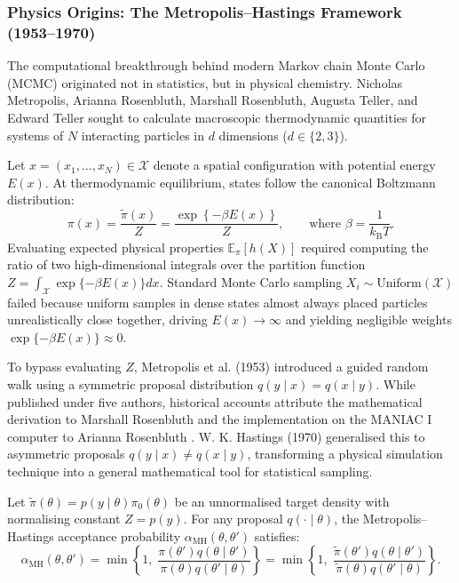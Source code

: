 \subsubsection{Physics Origins: The Metropolis--Hastings Framework (1953--1970)}
\label{subsec:metropolis-hastings}

The computational breakthrough behind modern Markov chain Monte Carlo (MCMC) originated not in statistics, but in physical chemistry. Nicholas Metropolis, Arianna Rosenbluth, Marshall Rosenbluth, Augusta Teller, and Edward Teller \cite{metropolis1953} sought to calculate macroscopic thermodynamic quantities for systems of $N$ interacting particles in $d$ dimensions ($d \in \{2, 3\}$).

Let $x = (x_1, \dots, x_N) \in \mathcal{X}$ denote a spatial configuration with potential energy $E(x)$. At thermodynamic equilibrium, states follow the canonical Boltzmann distribution:
\begin{equation}
    \pi(x) = \frac{\widetilde{\pi}(x)}{Z} = \frac{\exp\left\{-\beta E(x)\right\}}{Z}, \qquad \text{where } \beta = \frac{1}{k_{\mathrm{B}}T}.
\end{equation}
Evaluating expected physical properties $\mathbb{E}_{\pi}[h(X)]$ required computing the ratio of two high-dimensional integrals over the partition function $Z = \int_{\mathcal{X}} \exp\{-\beta E(x)\} dx$. Standard Monte Carlo sampling $X_i \sim \text{Uniform}(\mathcal{X})$ failed because uniform samples in dense states almost always placed particles unrealistically close together, driving $E(x) \to \infty$ and yielding negligible weights $\exp\{-\beta E(x)\} \approx 0$.

To bypass evaluating $Z$, Metropolis et al. (1953) \cite{metropolis1953} introduced a guided random walk using a symmetric proposal distribution $q(y \mid x) = q(x \mid y)$. While published under five authors, historical accounts attribute the mathematical derivation to Marshall Rosenbluth and the implementation on the MANIAC I computer to Arianna Rosenbluth \cite{gubernatis2005}. W. K. Hastings (1970) \cite{hastings1970} generalised this to asymmetric proposals $q(y \mid x) \neq q(x \mid y)$, transforming a physical simulation technique into a general mathematical tool for statistical sampling.

\begin{proposition}
\label{prop:cancellation-constant}
Let $\widetilde{\pi}(\theta) = p(y \mid \theta)\pi_0(\theta)$ be an unnormalised target density with normalising constant $Z = p(y)$. For any proposal $q(\cdot \mid \theta)$, the Metropolis--Hastings acceptance probability $\alpha_{\mathrm{MH}}(\theta, \theta')$ satisfies:
\begin{equation}
    \alpha_{\mathrm{MH}}(\theta, \theta') = \min\left\{1, \; \frac{\pi(\theta') q(\theta \mid \theta')}{\pi(\theta) q(\theta' \mid \theta)}\right\} = \min\left\{1, \; \frac{\widetilde{\pi}(\theta') q(\theta \mid \theta')}{\widetilde{\pi}(\theta) q(\theta' \mid \theta)}\right\}.
\end{equation}
\end{proposition}

